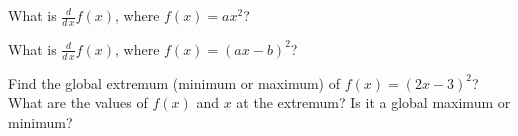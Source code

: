 \documentclass{article}
\begin{document}
What is $\frac{d}{d\,x} f(x)$, where $f(x) = a x^{2}$? 

\vspace{2in}

What is $\frac{d}{d\,x} f(x)$, where $f(x) = {(a x - b)}^{2}$?

\vspace{2in}

Find the global extremum (minimum or maximum) of $f(x) = {(2 x - 3)}^{2}$? What are the values of $f(x)$ and $x$ at the extremum? 
Is it a global maximum or minimum? 

\vspace{2in}
\end{document}
